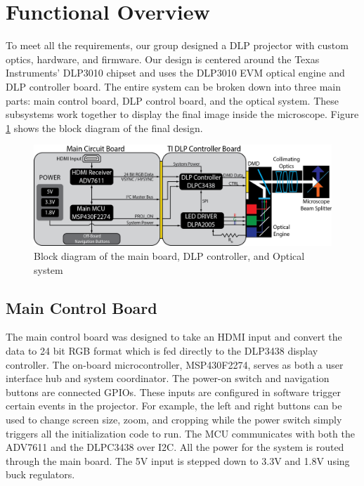 \documentclass[12pt,a4paper]{article}
\begin{document}
\section{Functional Overview}
To meet all the requirements, our group designed a DLP projector with custom optics, hardware, and firmware. Our design is centered around the Texas Instruments’ DLP3010 chipset and uses the DLP3010 EVM optical engine and DLP controller board.  The entire system can be broken down into three main parts: main control board, DLP control board, and the optical system. These subsystems work together to display the final image inside the microscope. Figure \ref{block_diagram} shows the block diagram of the final design.

\begin{figure}[h!]
	\centering
	\includegraphics[width = \textwidth]{pics/seniorDesign_blockDiagram.png}
	\caption[Block Diagram]{Block diagram of the main board, DLP controller, and Optical system}
	\label{block_diagram}
\end{figure}


\subsection{Main Control Board}
The main control board was designed to take an HDMI input and convert the data to 24 bit RGB format which is fed directly to the DLP3438 display controller. The on-board microcontroller, MSP430F2274, serves as both a user interface hub and system coordinator. The power-on switch and navigation buttons are connected GPIOs. These inputs are configured in software trigger certain events in the projector. For example, the left and right buttons can be used to change screen size, zoom, and cropping while the power switch simply triggers all the initialization code to run. The MCU communicates with both the ADV7611 and the DLPC3438 over I2C. All the power for the system is routed through the main board. The 5V input is stepped down to 3.3V and 1.8V using buck regulators. 
\end{document}
